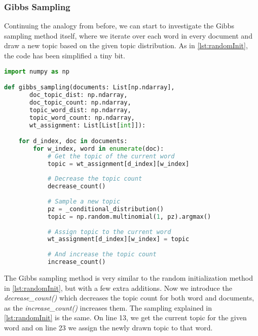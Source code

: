 \subsubsection{Gibbs Sampling}
Continuing the analogy from before, we can start to investigate the Gibbs sampling method itself, where we iterate over each word in every document and draw a new topic based on the given topic distribution.
As in \autoref{lst:randomInit}, the code has been simplified a tiny bit.
\begin{lstlisting}[language=Python, caption=Gibbs Sampling Method,label={lst:gibbsSampling}]
import numpy as np

def gibbs_sampling(documents: List[np.ndarray],
	   doc_topic_dist: np.ndarray,
	   doc_topic_count: np.ndarray,
	   topic_word_dist: np.ndarray,
	   topic_word_count: np.ndarray,
	   wt_assignment: List[List[int]]):

	for d_index, doc in documents:
		for w_index, word in enumerate(doc):
			# Get the topic of the current word
			topic = wt_assignment[d_index][w_index]
			
			# Decrease the topic count
			decrease_count()
			
			# Sample a new topic
			pz = _conditional_distribution()
			topic = np.random.multinomial(1, pz).argmax()
			
			# Assign topic to the current word
			wt_assignment[d_index][w_index] = topic
			
			# And increase the topic count
			increase_count()
\end{lstlisting}
The Gibbs sampling method is very similar to the random initialization method in \autoref{lst:randomInit}, but with a few extra additions. 
Now we introduce the \emph{decrease\_count()} which decreases the topic count for both word and documents, as the \emph{increase\_count()} increases them.
The sampling explained in \autoref{lst:randomInit} is the same.
On line 13, we get the current topic for the given word and on line 23 we assign the newly drawn topic to that word.